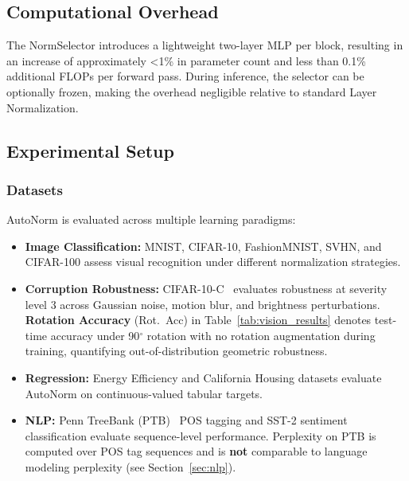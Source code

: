 \documentclass[conference]{IEEEtran}
\begin{document}
\subsection{Computational Overhead}
The NormSelector introduces a lightweight two-layer MLP per block,
resulting in an increase of approximately <1\% in parameter count and
less than 0.1\% additional FLOPs per forward pass. During inference,
the selector can be optionally frozen, making the overhead negligible
relative to standard Layer Normalization.
\subsection{Experimental Setup}

\subsubsection{Datasets}
\label{sec:datasets}

AutoNorm is evaluated across multiple learning paradigms:

\begin{itemize}
    \item \textbf{Image Classification:} MNIST, CIFAR-10, FashionMNIST,
      SVHN, and CIFAR-100 assess visual recognition under different
      normalization strategies.

    \item \textbf{Corruption Robustness:} CIFAR-10-C~\cite{hendrycks2019benchmarking}
      evaluates robustness at severity level 3 across Gaussian noise,
      motion blur, and brightness perturbations. \textbf{Rotation
      Accuracy} (Rot.\ Acc) in Table~\ref{tab:vision_results} denotes
      test-time accuracy under 90$^\circ$ rotation with no rotation
      augmentation during training, quantifying out-of-distribution
      geometric robustness.

    \item \textbf{Regression:} Energy Efficiency and California Housing
      datasets evaluate AutoNorm on continuous-valued tabular targets.

    \item \textbf{NLP:} Penn TreeBank (PTB)~\cite{marcus1993ptb} POS
      tagging and SST-2 sentiment classification evaluate sequence-level
      performance. Perplexity on PTB is computed over POS tag sequences
      and is \textbf{not} comparable to language modeling perplexity
      (see Section~\ref{sec:nlp}).
\end{itemize}
\end{document}
